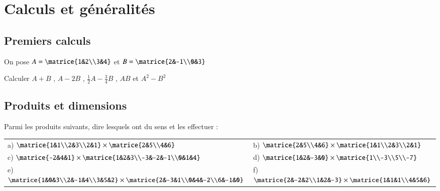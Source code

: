 \documentclass[oneside,12pt]{article}          %
\begin{document}
\section{Calculs et généralités}

\subsection{Premiers calculs}
On pose $A=\matrice{1&2\\3&4}$ et $B=\matrice{2&-1\\0&3}$

Calculer $A+B$ , $A-2B$ , $\frac{1}{2}A-\frac{3}{4}B$ , $AB$ et $A^2-B^2$



\subsection{Produits et dimensions}
Parmi les produits suivants, dire lesquels ont du sens et les effectuer : \\

\begin{tabular}{p{} p{}}
    a) $\matrice{1&1\\2&3\\2&1}\times\matrice{2&5\\4&6} $ &
    b) $\matrice{2&5\\4&6}\times\matrice{1&1\\2&3\\2&1} $ \\
    c) $\matrice{-2&4&1}\times\matrice{1&2&3\\-3&-2&-1\\0&1&4} $ &
    d) $\matrice{1&2&-3&0}\times\matrice{1\\-3\\5\\-7} $ \\
    e) $\matrice{1&0&3\\2&-1&4\\3&5&2}\times\matrice{2&-3&1\\0&4&-2\\6&-1&0} $ &
    f) $\matrice{2&-2&2\\1&2&-3}\times\matrice{1&1&1\\4&5&6} $
\end{tabular}
\end{document}
